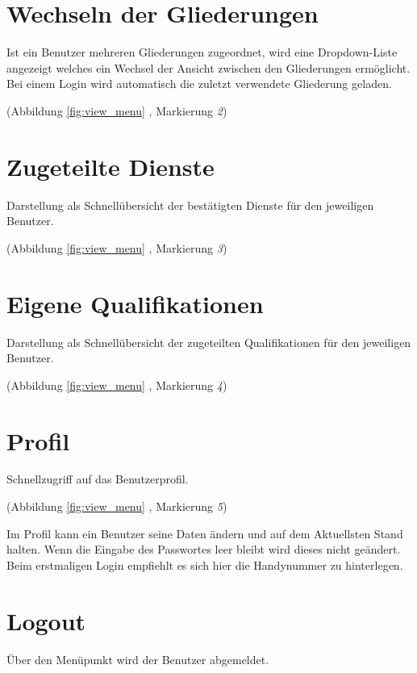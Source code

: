 \section{Wechseln der Gliederungen}
\label{sec:menu_changeclient}
Ist ein Benutzer mehreren Gliederungen zugeordnet, wird eine Dropdown-Liste angezeigt welches ein Wechsel der Ansicht zwischen den Gliederungen ermöglicht. Bei einem Login wird automatisch die zuletzt verwendete Gliederung geladen.

\noindent (Abbildung \ref{fig:view_menu} \textit{}, Markierung \textit{2})

\section{Zugeteilte Dienste}
\label{sec:menu_approvedservice}
Darstellung als Schnellübersicht der bestätigten Dienste für den jeweiligen Benutzer.

\noindent (Abbildung \ref{fig:view_menu} \textit{}, Markierung \textit{3})

\section{Eigene Qualifikationen}
\label{sec:menu_qualification}
Darstellung als Schnellübersicht der zugeteilten Qualifikationen für den jeweiligen Benutzer.

\noindent (Abbildung \ref{fig:view_menu} \textit{}, Markierung \textit{4})

\section{Profil}
\label{sec:menu_profile}
Schnellzugriff auf das Benutzerprofil.

\noindent (Abbildung \ref{fig:view_menu} \textit{}, Markierung \textit{5})

\vspace*{5mm} \noindent Im Profil kann ein Benutzer seine Daten ändern und auf dem Aktuellsten Stand halten. Wenn die Eingabe des Passwortes leer bleibt wird dieses nicht geändert. Beim erstmaligen Login empfiehlt es sich hier die Handynummer zu hinterlegen.  

\section{Logout}
\label{sec:menu_logout}
Über den Menüpunkt wird der Benutzer abgemeldet.

